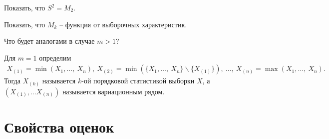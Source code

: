 \begin{exercise}
Показать, что $\displaystyle S^{2} =M_{2}$.
\end{exercise}
\begin{exercise}
Показать, что $\displaystyle M_{k}$ -- функция от выборочных характеристик.
\end{exercise}
\begin{exercise}
Что будет аналогами в случае $\displaystyle m >1$?
\end{exercise}
\begin{definition}
Для $\displaystyle m=1$ определим
\begin{gather*}
    X_{( 1)} =\min( X_{1} ,\dotsc ,\ X_{n}),\ X_{( 2)} =\min(\{X_{1},\dotsc,\ X_{n}\} \backslash \{X_{( 1)}\}),\ \dotsc,\ X_{( n)} =\max( X_{1}, \dotsc,\ X_{n}).
\end{gather*}
Тогда $\displaystyle X_{( k)}$ называется $\displaystyle k$-ой порядковой статистикой выборки $\displaystyle X$, а $\displaystyle ( X_{( 1)} ,\dotsc X_{( n)})$ называется вариационным рядом.
\end{definition}
\section{Свойства оценок}

